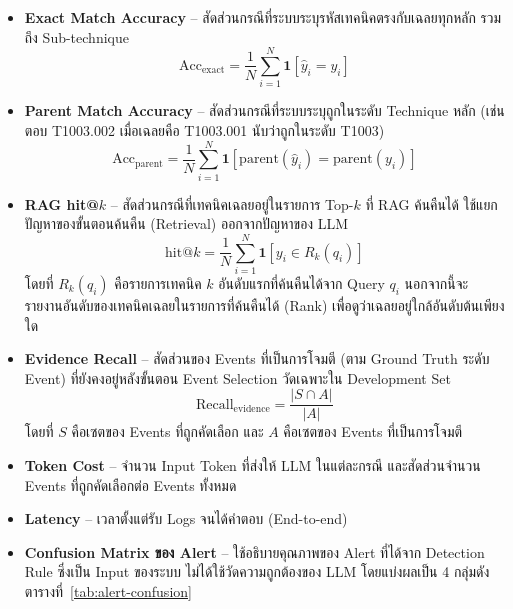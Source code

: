 \begin{itemize}
  \item \textbf{Exact Match Accuracy} -- สัดส่วนกรณีที่ระบบระบุรหัสเทคนิคตรงกับเฉลยทุกหลัก
        รวมถึง Sub-technique
        \begin{equation}
        \mathrm{Acc}_{\mathrm{exact}} = \frac{1}{N}\sum_{i=1}^{N} \mathbf{1}\left[\hat{y}_i = y_i\right]
        \end{equation}

  \item \textbf{Parent Match Accuracy} -- สัดส่วนกรณีที่ระบบระบุถูกในระดับ Technique หลัก
        (เช่น ตอบ T1003.002 เมื่อเฉลยคือ T1003.001 นับว่าถูกในระดับ T1003)
        \begin{equation}
        \mathrm{Acc}_{\mathrm{parent}} = \frac{1}{N}\sum_{i=1}^{N} \mathbf{1}\left[\mathrm{parent}(\hat{y}_i) = \mathrm{parent}(y_i)\right]
        \end{equation}

  \item \textbf{RAG hit@$k$} -- สัดส่วนกรณีที่เทคนิคเฉลยอยู่ในรายการ Top-$k$ ที่ RAG ค้นคืนได้
        ใช้แยกปัญหาของขั้นตอนค้นคืน (Retrieval) ออกจากปัญหาของ LLM
        \begin{equation}
        \mathrm{hit@}k = \frac{1}{N}\sum_{i=1}^{N} \mathbf{1}\left[y_i \in R_k(q_i)\right]
        \end{equation}
        โดยที่ $R_k(q_i)$ คือรายการเทคนิค $k$ อันดับแรกที่ค้นคืนได้จาก Query $q_i$
        นอกจากนี้จะรายงานอันดับของเทคนิคเฉลยในรายการที่ค้นคืนได้ (Rank)
        เพื่อดูว่าเฉลยอยู่ใกล้อันดับต้นเพียงใด

  \item \textbf{Evidence Recall} -- สัดส่วนของ Events ที่เป็นการโจมตี (ตาม Ground Truth ระดับ Event)
        ที่ยังคงอยู่หลังขั้นตอน Event Selection วัดเฉพาะใน Development Set
        \begin{equation}
        \mathrm{Recall}_{\mathrm{evidence}} = \frac{|S \cap A|}{|A|}
        \end{equation}
        โดยที่ $S$ คือเซตของ Events ที่ถูกคัดเลือก และ $A$ คือเซตของ Events ที่เป็นการโจมตี

  \item \textbf{Token Cost} -- จำนวน Input Token ที่ส่งให้ LLM ในแต่ละกรณี
        และสัดส่วนจำนวน Events ที่ถูกคัดเลือกต่อ Events ทั้งหมด

  \item \textbf{Latency} -- เวลาตั้งแต่รับ Logs จนได้คำตอบ (End-to-end)

  \item \textbf{Confusion Matrix ของ Alert} -- ใช้อธิบายคุณภาพของ Alert ที่ได้จาก Detection Rule
        ซึ่งเป็น Input ของระบบ ไม่ได้ใช้วัดความถูกต้องของ LLM
        โดยแบ่งผลเป็น 4 กลุ่มดังตารางที่~\ref{tab:alert-confusion}
\end{itemize}

